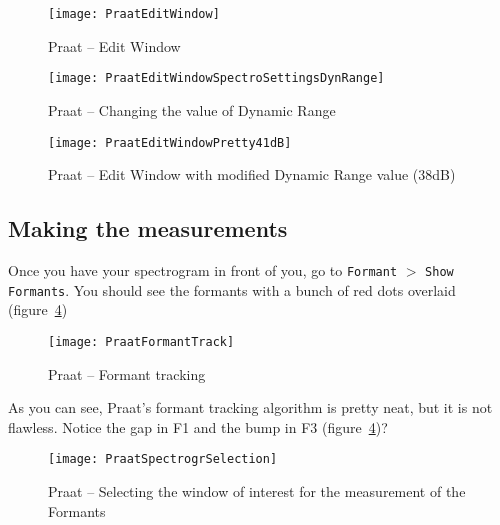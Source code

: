 \documentclass{article}
\newcommand{\soft}[1]{\textsf{#1}}
\newcommand{\softmenu}[1]{\texttt{#1}}
\newcommand{\Praat}{\soft{Praat}}
\begin{document}
\begin{figure}[!tbp]
\caption{\Praat{} -- Edit Window}
\label{step3look}
	\begin{center}
		\texttt{[image: PraatEditWindow]}
	\end{center}
\end{figure}

\begin{figure}[!tbp]
\caption{\Praat{} -- Changing the value of Dynamic Range}
\label{step4look}
	\begin{center}
		\texttt{[image: PraatEditWindowSpectroSettingsDynRange]}
	\end{center}
\end{figure}

\begin{figure}[!tbp]
\caption{\Praat{} -- Edit Window with modified Dynamic Range value (38dB)}
\label{step5look}
	\begin{center}
		\texttt{[image: PraatEditWindowPretty41dB]}
	\end{center}
\end{figure}

\subsection{Making the measurements}

Once you have your spectrogram in front of you, go to \softmenu{Formant} $>$ \softmenu{Show Formants}. You should see the formants with a bunch of red dots overlaid (figure~\ref{step1measure})

\begin{figure}[!tbp]
\caption{\Praat{} -- Formant tracking}
\label{step1measure}
	\begin{center}
		\texttt{[image: PraatFormantTrack]}
	\end{center}
\end{figure}

As you can see, \Praat{}'s formant tracking algorithm is pretty neat, but it is not flawless. Notice the gap in F1 and the bump in F3 (figure~\ref{step1measure})?

\begin{figure}[!tbp]
\caption{\Praat{} -- Selecting the window of interest for the measurement of the Formants}
\label{step2measure}
	\begin{center}
		\texttt{[image: PraatSpectrogrSelection]}
	\end{center}
\end{figure}
\end{document}
